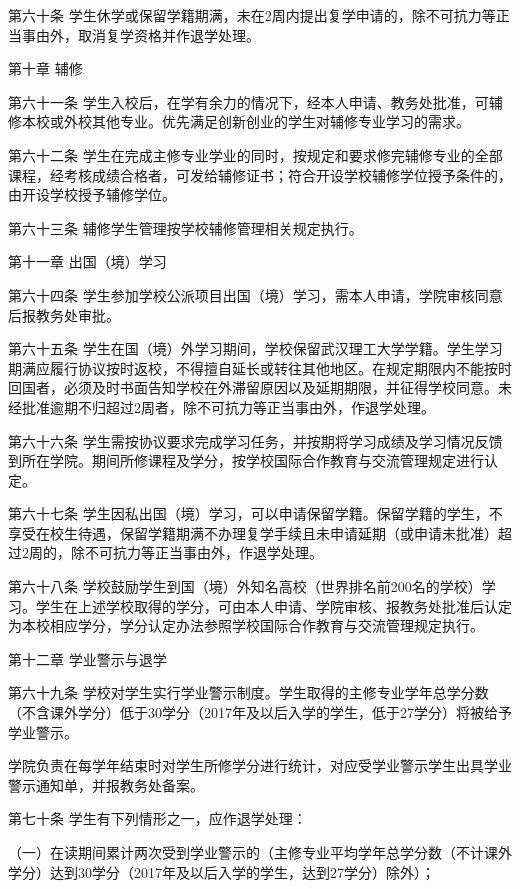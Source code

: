 \documentclass[UTF8,12pt,a4paper]{report}
\begin{document}
第六十条  学生休学或保留学籍期满，未在2周内提出复学申请的，除不可抗力等正当事由外，取消复学资格并作退学处理。



第十章  辅修

第六十一条  学生入校后，在学有余力的情况下，经本人申请、教务处批准，可辅修本校或外校其他专业。优先满足创新创业的学生对辅修专业学习的需求。

第六十二条  学生在完成主修专业学业的同时，按规定和要求修完辅修专业的全部课程，经考核成绩合格者，可发给辅修证书；符合开设学校辅修学位授予条件的，由开设学校授予辅修学位。

第六十三条  辅修学生管理按学校辅修管理相关规定执行。



第十一章  出国（境）学习

第六十四条  学生参加学校公派项目出国（境）学习，需本人申请，学院审核同意后报教务处审批。

第六十五条  学生在国（境）外学习期间，学校保留武汉理工大学学籍。学生学习期满应履行协议按时返校，不得擅自延长或转往其他地区。在规定期限内不能按时回国者，必须及时书面告知学校在外滞留原因以及延期期限，并征得学校同意。未经批准逾期不归超过2周者，除不可抗力等正当事由外，作退学处理。

第六十六条  学生需按协议要求完成学习任务，并按期将学习成绩及学习情况反馈到所在学院。期间所修课程及学分，按学校国际合作教育与交流管理规定进行认定。

第六十七条  学生因私出国（境）学习，可以申请保留学籍。保留学籍的学生，不享受在校生待遇，保留学籍期满不办理复学手续且未申请延期（或申请未批准）超过2周的，除不可抗力等正当事由外，作退学处理。

第六十八条  学校鼓励学生到国（境）外知名高校（世界排名前200名的学校）学习。学生在上述学校取得的学分，可由本人申请、学院审核、报教务处批准后认定为本校相应学分，学分认定办法参照学校国际合作教育与交流管理规定执行。



第十二章  学业警示与退学

第六十九条  学校对学生实行学业警示制度。学生取得的主修专业学年总学分数（不含课外学分）低于30学分（2017年及以后入学的学生，低于27学分）将被给予学业警示。

学院负责在每学年结束时对学生所修学分进行统计，对应受学业警示学生出具学业警示通知单，并报教务处备案。

第七十条  学生有下列情形之一，应作退学处理：

（一）在读期间累计两次受到学业警示的（主修专业平均学年总学分数（不计课外学分）达到30学分（2017年及以后入学的学生，达到27学分）除外）；   
\end{document}
